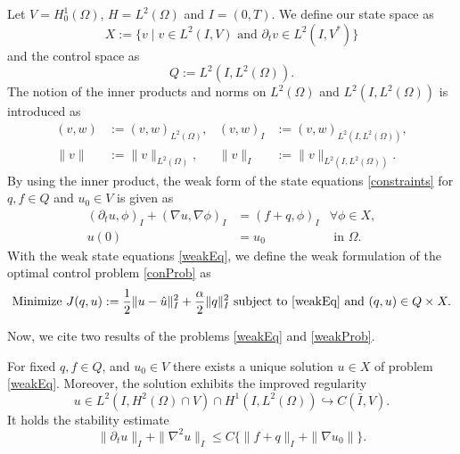 Let $V=H_0^1(\Omega)$, $H=L^2(\Omega)$ and $I=(0,T)$. We define our state space as
\begin{displaymath}
X:=\{v\mid v\in L^2(I,V)\text{ and }\partial_tv\in L^2(I,V^*)\}
\end{displaymath}
and the control space as
\begin{displaymath}
Q:=L^2(I,L^2(\Omega)).
\end{displaymath}
The notion of the inner products and norms on $L^2(\Omega)$ and $L^2(I,L^2(\Omega))$ is introduced as
\begin{align*}
(v,w)&:=(v,w)_{L^2(\Omega)},&(v,w)_I&:=(v,w)_{L^2(I,L^2(\Omega))},\\
\|v\|&:=\|v\|_{L^2(\Omega)},&\|v\|_I&:=\|v\|_{L^2(I,L^2(\Omega))}.
\end{align*}
By using the inner product, the weak form of the state equations \eqref{constraints} for $q,f\in Q$ and $u_0\in V$ is given as
\begin{equation}
\label{weakEq}
\begin{aligned}
	(\partial_tu,\phi)_I+(\nabla u,\nabla\phi)_I&=(f+q,\phi)_I&\forall\phi\in X,\\
	u(0)&=u_0&\text{ in }\Omega.
\end{aligned}
\end{equation}
With the weak state equations \eqref{weakEq}, we define the weak formulation of the optimal control problem \eqref{conProb} as
\begin{equation}
\label{weakProb}
\text{Minimize }J(q,u):=\frac{1}{2}\|u-\hat{u}\|_I^2+\frac{\alpha}{2}\|q\|_I^2\text{ subject to \eqref{weakEq} and }(q,u)\in Q\times X.
\end{equation}

Now, we cite two results of the problems \eqref{weakEq} and \eqref{weakProb}.

\begin{prop}
\label{uniqueU}
For fixed $q,f\in Q$, and $u_0\in V$ there exists a unique solution $u\in X$ of problem \eqref{weakEq}. Moreover, the solution exhibits the improved regularity
\begin{displaymath}
u\in L^2(I,H^2(\Omega)\cap V)\cap H^1(I,L^2(\Omega))\hookrightarrow C(\bar{I},V).
\end{displaymath}
It holds the stability estimate
\begin{displaymath}
\|\partial_tu\|_I+\|\nabla^2u\|_I\leq C\{\|f+q\|_I+\|\nabla u_0\|\}.
\end{displaymath}
\end{prop}


